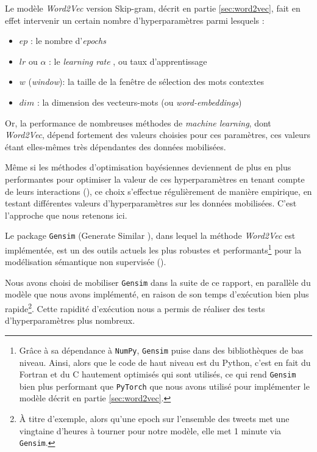 \documentclass[11pt,french,french]{article}
\let\rmarkdownfootnote\footnote%
\def\footnote{\protect\rmarkdownfootnote}
\begin{document}
Le modèle \emph{Word2Vec} version Skip-gram, décrit en partie
\ref{sec:word2vec}, fait en effet intervenir un certain nombre
d'hyperparamètres parmi lesquels :

\begin{itemize}
\item $ep$ : le nombre d'\og \emph{epochs} \fg{}
\item $lr$ ou $\alpha$ : le \og \emph{learning rate} \fg{}, ou taux d'apprentissage
\item $w$ (\emph{window}): la taille de la fenêtre de sélection des mots contextes
\item $dim$ : la dimension des vecteurs-mots (ou \emph{word-embeddings})
\end{itemize}

Or, la performance de nombreuses méthodes de \emph{machine learning},
dont \emph{Word2Vec}, dépend fortement des valeurs choisies pour ces
paramètres, ces valeurs étant elles-mêmes très dépendantes des données
mobilisées.

Même si les méthodes d'optimisation bayésiennes deviennent de plus en
plus performantes pour optimiser la valeur de ces hyperparamètres en
tenant compte de leurs interactions (\cite{Hutter}), ce choix s'effectue
régulièrement de manière empirique, en testant différentes valeurs
d'hyperparamètres sur les données mobilisées. C'est l'approche que nous
retenons ici.

Le package \texttt{Gensim} (\og Generate Similar \fg{}), dans lequel la
méthode \emph{Word2Vec} est implémentée, est un des outils actuels les
plus robustes et performants\footnote{Grâce à sa dépendance à
  \texttt{NumPy}, \texttt{Gensim} puise dans des bibliothèques de bas
  niveau. Ainsi, alors que le code de haut niveau est du Python, c'est
  en fait du Fortran et du C hautement optimisés qui sont utilisés, ce
  qui rend \texttt{Gensim} bien plus performant que \texttt{PyTorch} que
  nous avons utilisé pour implémenter le modèle décrit en partie
  \ref{sec:word2vec}.} pour la modélisation sémantique non supervisée
(\cite{Rehurek}).

Nous avons choisi de mobiliser \texttt{Gensim} dans la suite de ce
rapport, en parallèle du modèle que nous avons implémenté, en raison de
son temps d'exécution bien plus rapide\footnote{À titre d'exemple, alors
  qu'une epoch sur l'ensemble des tweets met une vingtaine d'heures à
  tourner pour \og notre \fg{} modèle, elle met 1 minute via
  \texttt{Gensim}.}. Cette rapidité d'exécution nous a permis de
réaliser des tests d'hyperparamètres plus nombreux.
\end{document}
